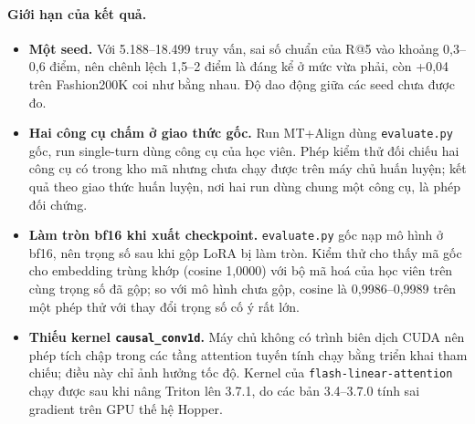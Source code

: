 \paragraph{Giới hạn của kết quả.}
\begin{itemize}
    \item \textbf{Một seed.} Với 5.188--18.499 truy vấn, sai số chuẩn của R@5 vào khoảng 0,3--0,6 điểm, nên chênh lệch 1,5--2 điểm là đáng kể ở mức vừa phải, còn +0,04 trên Fashion200K coi như bằng nhau. Độ dao động giữa các seed chưa được đo.
    \item \textbf{Hai công cụ chấm ở giao thức gốc.} Run MT+Align dùng \texttt{evaluate.py} gốc, run single-turn dùng công cụ của học viên. Phép kiểm thử đối chiếu hai công cụ có trong kho mã nhưng chưa chạy được trên máy chủ huấn luyện; kết quả theo giao thức huấn luyện, nơi hai run dùng chung một công cụ, là phép đối chứng.
    \item \textbf{Làm tròn bf16 khi xuất checkpoint.} \texttt{evaluate.py} gốc nạp mô hình ở bf16, nên trọng số sau khi gộp LoRA bị làm tròn. Kiểm thử cho thấy mã gốc cho embedding trùng khớp (cosine 1,0000) với bộ mã hoá của học viên trên cùng trọng số đã gộp; so với mô hình chưa gộp, cosine là 0,9986--0,9989 trên một phép thử với thay đổi trọng số cố ý rất lớn.
    \item \textbf{Thiếu kernel \texttt{causal\_conv1d}.} Máy chủ không có trình biên dịch CUDA nên phép tích chập trong các tầng attention tuyến tính chạy bằng triển khai tham chiếu; điều này chỉ ảnh hưởng tốc độ. Kernel của \texttt{flash-linear-attention} chạy được sau khi nâng Triton lên 3.7.1, do các bản 3.4--3.7.0 tính sai gradient trên GPU thế hệ Hopper.
\end{itemize}
